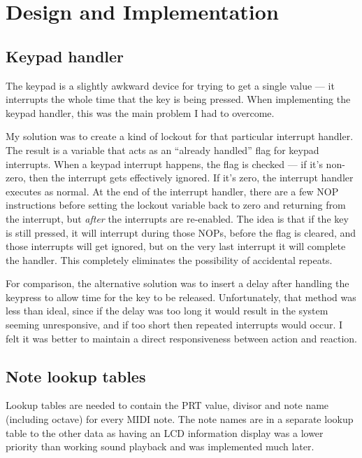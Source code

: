 \section{Design and Implementation}

\subsection{Keypad handler}

The keypad is a slightly awkward device for trying to get a single value --- it interrupts the whole 
time that the key is being pressed.  When implementing the keypad handler, this was the main problem 
I had to overcome.

My solution was to create a kind of lockout for that particular interrupt handler.  The result is a 
variable that acts as an ``already handled'' flag for keypad interrupts.  When a keypad interrupt 
happens, the flag is checked --- if it's non-zero, then the interrupt gets effectively ignored.  If 
it's zero, the interrupt handler executes as normal.  At the end of the interrupt handler, there are 
a few NOP instructions before setting the lockout variable back to zero and returning from the 
interrupt, but \emph{after} the interrupts are re-enabled.  The idea is that if the key is still 
pressed, it will interrupt during those NOPs, before the flag is cleared, and those interrupts will 
get ignored, but on the very last interrupt it will complete the handler.  This completely 
eliminates the possibility of accidental repeats.

For comparison, the alternative solution was to insert a delay after handling the keypress to allow 
time for the key to be released.  Unfortunately, that method was less than ideal, since if the delay 
was too long it would result in the system seeming unresponsive, and if too short then repeated 
interrupts would occur.  I felt it was better to maintain a direct responsiveness between action and 
reaction.

\subsection{Note lookup tables}
\label{notelookuptables}

Lookup tables are needed to contain the PRT value, divisor and note name (including octave) for 
every MIDI note.  The note names are in a separate lookup table to the other data as having an LCD 
information display was a lower priority than working sound playback and was implemented much later.

